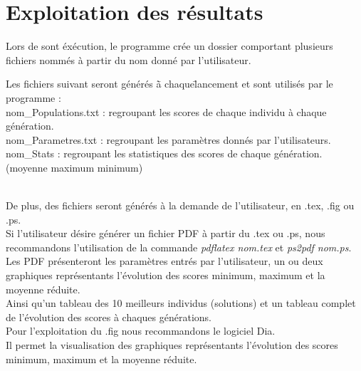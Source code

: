 \documentclass[a4paper,11pt]{article}
\begin{document}
\section{Exploitation des résultats}
Lors de sont éxécution, le programme crée un dossier comportant plusieurs fichiers nommés à partir du nom donné par l'utilisateur.\\
\begin{tabbing}
Les fichiers suivant seront générés \=à chaque\= lancement et sont utilisés par le programme : \\
nom\_Populations.txt : \> regroupant les scores de chaque individu à chaque génération.\\
nom\_Parametres.txt : \>	regroupant les paramètres donnés par l'utilisateurs.\\
nom\_Stats : \> regroupant les statistiques des scores de chaque génération. \\
\>\>(moyenne maximum minimum)\\\\
\end{tabbing}
De plus, des fichiers seront générés à la demande de l'utilisateur, en .tex, .fig ou .ps.\\
Si l'utilisateur désire générer un fichier PDF  à partir du .tex ou .ps, nous recommandons l'utilisation de la commande \textit{pdflatex nom.tex} et \textit{ps2pdf nom.ps}.\\
Les PDF présenteront les paramètres entrés par l'utilisateur, un ou deux graphiques représentants l'évolution des scores minimum, maximum et la moyenne réduite.\\
Ainsi qu'un tableau des 10 meilleurs individus (solutions) et un tableau complet de l'évolution des scores à chaques générations.\\
Pour l'exploitation du .fig nous recommandons le logiciel Dia.\\
Il permet la visualisation des graphiques représentants l'évolution des scores minimum, maximum et la moyenne réduite.\\

	
\end{document}
